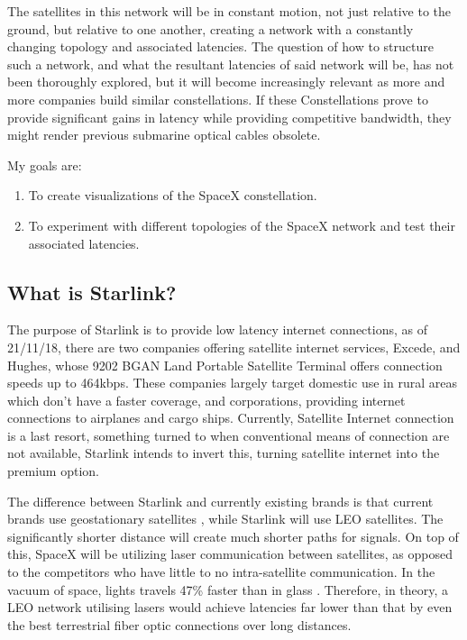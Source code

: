 \documentclass[12pt]{article}
\begin{document}
The satellites in this network will be in constant motion, not just relative to the ground, but relative to one another, creating a network with a constantly changing topology and associated latencies. The question of how to structure such a network, and what the resultant latencies of said network will be, has not been thoroughly explored, but it will become increasingly relevant as more and more companies build similar constellations. If these Constellations prove to provide significant gains in latency while providing competitive bandwidth, they might render previous submarine optical cables obsolete.

My goals are:
\begin{enumerate}
	\item To create visualizations of the SpaceX constellation.
	\item To experiment with different topologies of the SpaceX network and test their associated latencies. 
\end{enumerate}

\subsection{What is Starlink?}

The purpose of Starlink is to provide low latency internet connections, as of 21/11/18, there are two companies offering satellite internet services, Excede\cite{ExcedeWebsite}, and Hughes, whose 9202 BGAN Land Portable Satellite Terminal offers connection speeds up to 464kbps\cite{HughesWebsite}. These companies largely target domestic use in rural areas which don’t have a faster coverage, and corporations, providing internet connections to airplanes and cargo ships. Currently, Satellite Internet connection is a last resort, something turned to when conventional means of connection are not available, Starlink intends to invert this, turning satellite internet into the premium option. 

The difference between Starlink and currently existing brands is that current brands use geostationary satellites \cite{HughesPressRelease}, while Starlink will use LEO satellites. The significantly shorter distance will create much shorter paths for signals. On top of this, SpaceX will be utilizing laser communication between satellites, as opposed to the competitors who have little to no intra-satellite communication. In the vacuum of space, lights travels 47\% faster than in glass \cite{PropertiesOfGlass}. Therefore, in theory, a LEO network utilising lasers would achieve latencies far lower than that by even the best terrestrial fiber optic connections over long distances.
\end{document}

